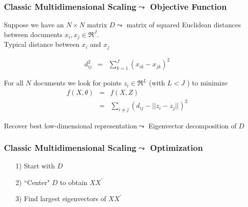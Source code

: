 \begin{frame}[fragile]
\frametitle{Classic Multidimensional Scaling$\leadsto$ Objective Function}

Suppose we have an $N \times N$ matrix ${D}\leadsto$  matrix of squared Euclidean distances between documents ${x}_{i}, {x}_{j}  \in \Re^{J}$.  \\

Typical distance between ${x}_{i}$ and ${x}_{j}$  

\begin{eqnarray}
d_{ij}^{2} & = & \sum_{k=1}^{J} (x_{ik} - x_{jk})^{2} \nonumber 
\end{eqnarray}

For all $N$ documents we look for points ${z}_{i} \in \Re^{L}$ (with $L < J$ ) to minimize 
\begin{eqnarray}
f({X}, {\theta}) & = & f({X}, {Z}) \nonumber \\
 & =& \sum_{i\neq j} \left(d_{ij} - ||z_{i} - z_{j}|| \right)^{2} \nonumber  
\end{eqnarray}

\alert{Recover best low-dimensional representation}$\leadsto$ Eigenvector decomposition of ${D}$

\end{frame}


\begin{frame}[fragile]
\frametitle{Classic Multidimensional Scaling$\leadsto$ Optimization}

\begin{itemize}
\item[1)] Start with ${D}$ \\
\item[2)] ``Center" ${D}$ to obtain ${X}{X}^{'}$
\item[3)] Find largest eigenvectors of ${X}{X}^{'}$
\end{itemize}

\end{frame}


